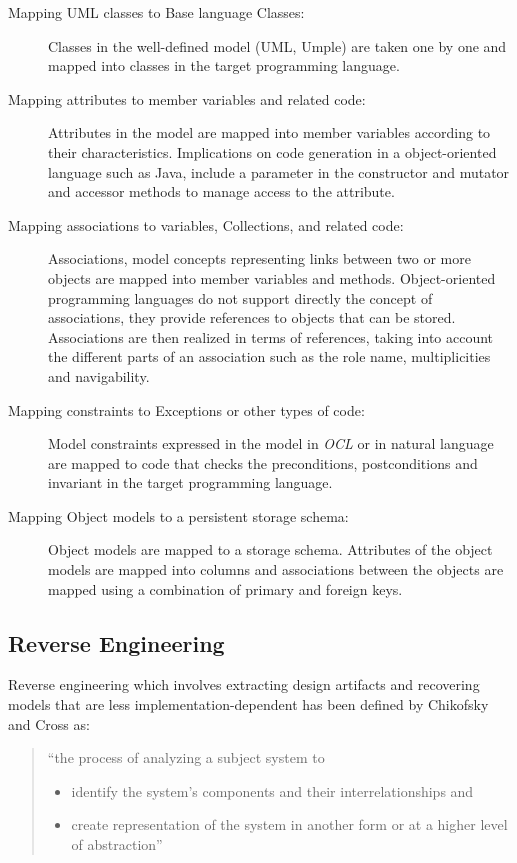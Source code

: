 \begin{description}

\item [Mapping UML classes to Base language Classes:]
Classes in the well-defined model (UML, Umple) are taken one by one and mapped into classes in the target programming language. 

\item [Mapping attributes to member variables and related code:]
Attributes in the model are mapped into member variables according to their characteristics. Implications on code generation in a object-oriented language such as Java, include a parameter in the constructor and mutator and accessor methods to manage access to the attribute.

\item [Mapping associations to variables, Collections, and related code:]
Associations, model concepts representing links between two or more objects are mapped into member variables and methods. Object-oriented programming languages do not support directly the concept of associations, they provide references to objects that can be stored. Associations are then realized in terms of references, taking into account the different parts of an association such as the role name, multiplicities and navigability. 

\item [Mapping constraints to Exceptions or other types of code:]
Model constraints expressed in the model in \textit{OCL} or in natural language are mapped to code that checks the preconditions, postconditions and invariant in the target programming language.

\item [Mapping Object models to a persistent storage schema:]
Object models are mapped to a storage schema. Attributes of the object models are mapped into columns and associations between the objects are mapped using a combination of primary and foreign keys. 
\end{description}

\subsection{Reverse Engineering}

Reverse engineering which involves extracting design artifacts and recovering models that are less implementation-dependent has been defined by Chikofsky and Cross \cite{Chikofsky} as:

\begin{quote} 
``the process of analyzing a subject system to
\begin{itemize}
\item identify the system's components and their interrelationships and
\item create representation of the system in another form or at a higher level of abstraction''
\end{itemize}
\end{quote}

